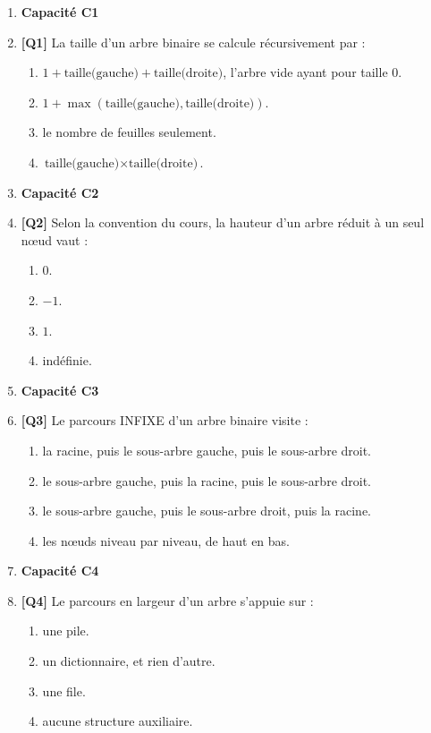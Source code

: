\begin{enumerate}

\item[] \textbf{Capacité C1}

\item \textbf{[Q1]} La taille d'un arbre binaire se calcule récursivement par :
  \begin{enumerate}[label=\Alph*.]
    \item $1 + \text{taille(gauche)} + \text{taille(droite)}$, l'arbre vide ayant pour taille $0$.
    \item $1 + \max(\text{taille(gauche)}, \text{taille(droite)})$.
    \item le nombre de feuilles seulement.
    \item $\text{taille(gauche)} \times \text{taille(droite)}$.
  \end{enumerate}

\item[] \textbf{Capacité C2}

\item \textbf{[Q2]} Selon la convention du cours, la hauteur d'un arbre réduit à un seul nœud vaut :
  \begin{enumerate}[label=\Alph*.]
    \item $0$.
    \item $-1$.
    \item $1$.
    \item indéfinie.
  \end{enumerate}

\item[] \textbf{Capacité C3}

\item \textbf{[Q3]} Le parcours INFIXE d'un arbre binaire visite :
  \begin{enumerate}[label=\Alph*.]
    \item la racine, puis le sous-arbre gauche, puis le sous-arbre droit.
    \item le sous-arbre gauche, puis la racine, puis le sous-arbre droit.
    \item le sous-arbre gauche, puis le sous-arbre droit, puis la racine.
    \item les nœuds niveau par niveau, de haut en bas.
  \end{enumerate}

\item[] \textbf{Capacité C4}

\item \textbf{[Q4]} Le parcours en largeur d'un arbre s'appuie sur :
  \begin{enumerate}[label=\Alph*.]
    \item une pile.
    \item un dictionnaire, et rien d'autre.
    \item une file.
    \item aucune structure auxiliaire.
  \end{enumerate}


\end{enumerate}
